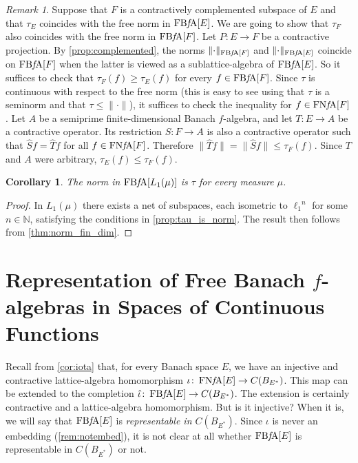 \documentclass{memo-l}
\newtheorem{cor}[theorem]{Corollary}
\theoremstyle{definition}
\theoremstyle{remark}
\newtheorem{rem}[theorem]{Remark}
\numberwithin{section}{chapter}
\numberwithin{equation}{chapter}
\newcommand\N{\ensuremath{\mathbb{N}}}
\newcommand{\el}[1]{\ensuremath{\ell_{#1}}}
\newcommand{\falg}{$f\!$-algebra}
\newcommand{\FNFA}[1]{\operatorname{FN{\it f}\!A}[#1]}
\newcommand{\FBFA}[1]{\operatorname{FB{\it f}\!A}[#1]}
\begin{document}
\begin{rem}
    Suppose that $F$ is a contractively complemented subspace of $E$ and
    that $\tau _E$ coincides with the free norm in $\FBFA E$. We are
    going to show that $\tau _F$ also coincides with the free norm in
    $\FBFA F$. Let $P\colon
    E\to F$ be a contractive projection. By
    \cref{prop:complemented}, the norms $\|{\cdot }\|_{\FBFA {F}}$
    and $\|{\cdot }\|_{\FBFA E}$ coincide on $\FBFA{F}$ when the
    latter is viewed as a sublattice-algebra of $\FBFA E$. So it suffices to
    check that $\tau _{F}(f)\ge \tau _E(f)$ for every
    $f \in \FBFA {F}$. Since $\tau $ is continuous with respect to the
    free norm (this is easy to see using that $\tau $ is a seminorm
    and that $\tau \le \|{\cdot }\|$), it suffices to
    check the inequality for $f \in \FNFA {F}$. Let $A$ be a semiprime
    finite-dimensional Banach \falg, and let $T\colon E\to A$
    be a contractive operator. Its restriction $S\colon F\to A$ is
    also a contractive operator such that $\hat{S}f=\hat{T}f$ for all
    $f \in \FNFA {F}$. Therefore $\|\hat{T}f\|=\|\hat{S}f\|\le \tau
    _{F}(f)$. Since $T$ and $A$ were arbitrary, $\tau _E(f)\le \tau
    _{F}(f)$.
\end{rem}

\begin{cor}\label{cor:tau_is_norm_example}
    The norm in $\FBFA{L_1(\mu )}$ is $\tau $ for every measure $\mu $.
\end{cor}
\begin{proof}
    In $L_1(\mu )$ there exists a net of subspaces, each isometric to
    $\el 1^{n}$ for some $n \in \N$, satisfying the conditions in
    \cref{prop:tau_is_norm}. The result then follows from
    \cref{thm:norm_fin_dim}.
\end{proof}

\chapter[Representation of Free Banach \texorpdfstring{$f$-algebras}{f-algebras}]{Representation of Free Banach
\texorpdfstring{$f$-algebras}{f-algebras} in Spaces of Continuous
Functions}
\label{sec:representation}

Recall from \cref{cor:iota} that, for every Banach space $E$, we have an
injective and contractive lattice-algebra homomorphism $\iota \colon
\FNFA E\to C(B_{E^{*}})$. This map can be extended to the completion
$\hat{\iota }\colon \FBFA E\to C(B_{E^{*}})$. The extension is
certainly contractive and a lattice-algebra homomorphism. But is it
injective? When it is, we will say that
$\FBFA E$ is \emph{representable in $C(B_{E^{*}})$}. Since $\iota $ is
never an embedding (\cref{rem:notembed}), it is not clear at all
whether $\FBFA E$ is representable in $C(B_{E^{*}})$ or not.
\end{document}
